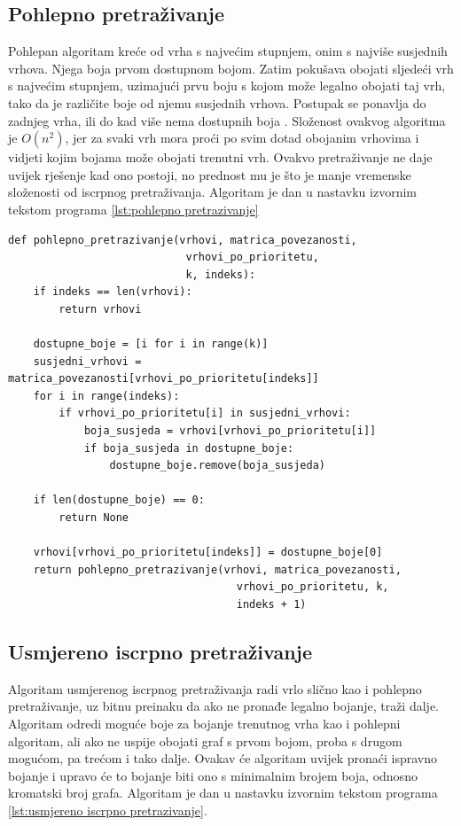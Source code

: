 \documentclass[times, utf8, zavrsni, numeric]{fer}
\begin{document}
\subsection{Pohlepno pretraživanje}
Pohlepan algoritam kreće od vrha s najvećim stupnjem, onim s najviše susjednih vrhova. Njega boja prvom dostupnom bojom. Zatim pokušava obojati sljedeći vrh s najvećim stupnjem, uzimajući prvu boju s kojom može legalno obojati taj vrh, tako da je različite boje od njemu susjednih vrhova. Postupak se ponavlja do zadnjeg vrha, ili do kad više nema dostupnih boja \cite{cranston2015brooks}. Složenost ovakvog algoritma je $O(n^2)$, jer za svaki vrh mora proći po svim dotad obojanim vrhovima i vidjeti kojim bojama može obojati trenutni vrh. Ovakvo pretraživanje ne daje uvijek rješenje kad ono postoji, no prednost mu je što je manje vremenske složenosti od iscrpnog pretraživanja. Algoritam je dan u nastavku izvornim tekstom programa \ref{lst:pohlepno pretrazivanje}

\begin{lstlisting}[caption=Pohlepno pretraživanje, label={lst:pohlepno pretrazivanje}]
def pohlepno_pretrazivanje(vrhovi, matrica_povezanosti, 
                            vrhovi_po_prioritetu, 
                            k, indeks):
    if indeks == len(vrhovi):
        return vrhovi
    
    dostupne_boje = [i for i in range(k)]
    susjedni_vrhovi = matrica_povezanosti[vrhovi_po_prioritetu[indeks]]
    for i in range(indeks):
        if vrhovi_po_prioritetu[i] in susjedni_vrhovi:
            boja_susjeda = vrhovi[vrhovi_po_prioritetu[i]]
            if boja_susjeda in dostupne_boje:
                dostupne_boje.remove(boja_susjeda)
    
    if len(dostupne_boje) == 0:
        return None
    
    vrhovi[vrhovi_po_prioritetu[indeks]] = dostupne_boje[0]
    return pohlepno_pretrazivanje(vrhovi, matrica_povezanosti, 
                                    vrhovi_po_prioritetu, k, 
                                    indeks + 1)
\end{lstlisting}


\subsection{Usmjereno iscrpno pretraživanje}
Algoritam usmjerenog iscrpnog pretraživanja radi vrlo slično kao i pohlepno pretraživanje, uz bitnu preinaku da ako ne pronađe legalno bojanje, traži dalje. Algoritam odredi moguće boje za bojanje trenutnog vrha kao i pohlepni algoritam, ali ako ne uspije obojati graf s prvom bojom, proba s drugom mogućom, pa trećom i tako dalje. Ovakav će algoritam uvijek pronaći ispravno bojanje i upravo će to bojanje biti ono s minimalnim brojem boja, odnosno kromatski broj grafa. Algoritam je dan u nastavku izvornim tekstom programa \ref{lst:usmjereno iscrpno pretrazivanje}.
\end{document}
